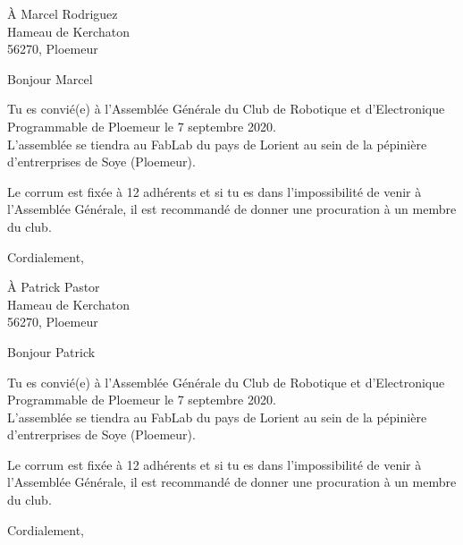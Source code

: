 \documentclass[12pt]{lettre}
\makeatletter
\newcommand{\NoRule}{\renewcommand*{\rule@length}{0}}
\makeatother
\begin{document}
   \begin{letter}{À Marcel Rodriguez\\Hameau de Kerchaton\\
               56270, Ploemeur
                  }
      \NoRule
      \nodate
      \nolieu%
      \address{Nicolas Le Guerroué\\20 rue du roi Arthur\\
               56270, Ploemeur}
      \nofax
      \opening{Bonjour Marcel}
      
      Tu es convié(e) à l'Assemblée Générale du Club de Robotique et d'Electronique Programmable de Ploemeur le 7 septembre 2020. \\
      
      L'assemblée se tiendra au FabLab du pays de Lorient au sein de la pépinière d'entrerprises de Soye (Ploemeur).
      
      Le corrum est fixée à 12 adhérents et si tu es dans l'impossibilité de venir à l'Assemblée Générale, il est recommandé de donner une procuration à un membre du club.
      
      \closing{Cordialement, }
     
   \end{letter}
   
   
   
   \begin{letter}{À Patrick Pastor\\Hameau de Kerchaton\\
               56270, Ploemeur
                  }
      \NoRule
      \nodate
      \nolieu%
      \address{Nicolas Le Guerroué\\20 rue du roi Arthur\\
               56270, Ploemeur}
      \nofax
      \opening{Bonjour Patrick}
      
      Tu es convié(e) à l'Assemblée Générale du Club de Robotique et d'Electronique Programmable de Ploemeur le 7 septembre 2020. \\
      
      L'assemblée se tiendra au FabLab du pays de Lorient au sein de la pépinière d'entrerprises de Soye (Ploemeur).
      
      Le corrum est fixée à 12 adhérents et si tu es dans l'impossibilité de venir à l'Assemblée Générale, il est recommandé de donner une procuration à un membre du club.
      
      \closing{Cordialement, }
     
   \end{letter}
   
   
\end{document}

